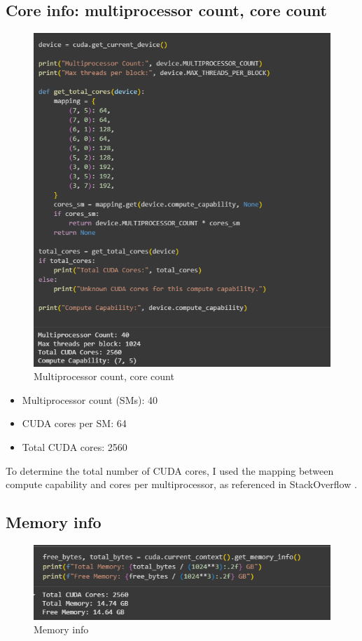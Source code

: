 \documentclass[hidelinks,12pt,a4paper]{article}
\begin{document}
\subsection{Core info: multiprocessor count, core count}
\begin{figure}[H]
    \centering
    \includegraphics[width=0.75\linewidth]{fig/multiprocessor count and core count.png}
    \caption{Multiprocessor count, core count}
    \label{fig:placeholder}
\end{figure}
\begin{itemize}
    \item Multiprocessor count (SMs): 40
    \item CUDA cores per SM: 64
    \item {Total CUDA cores:} 2560
\end{itemize}

To determine the total number of CUDA cores, I used the mapping between compute capability and cores per multiprocessor, as referenced in StackOverflow \cite{stackoverflow-cuda-cores}.

\subsection{Memory info}
\begin{figure}[H]
    \centering
    \includegraphics[width=0.8\linewidth]{fig/Memory info.png}
    \caption{Memory info}
    \label{fig:placeholder}
\end{figure}
\end{document}
